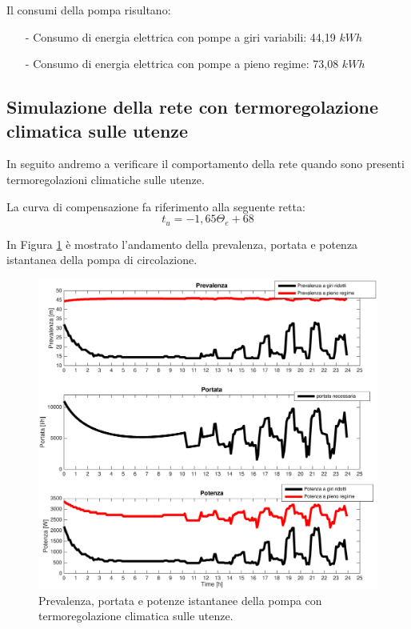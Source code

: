 \documentclass[laurea,oneside,11pt]{USiena_tesiLM3}
\begin{document}
Il consumi della pompa risultano:
\begin{itemize}
\item[-] Consumo di energia elettrica con pompe a giri variabili: 44,19 $kWh$ 
\item[-] Consumo di energia elettrica con pompe a pieno regime: 73,08 $kWh$
\end{itemize}

\subsection{Simulazione della rete con termoregolazione climatica sulle utenze}
In seguito andremo a verificare il comportamento della rete quando sono presenti termoregolazioni climatiche sulle utenze. 

La curva di compensazione fa riferimento alla seguente retta:
\begin{equation}
t_u = -1,65 \Theta_e + 68
\end{equation}

In Figura \ref{fig:sim_climatica} è mostrato l'andamento della prevalenza, portata e potenza istantanea della pompa di circolazione.

\begin{figure}[!ht]
\centering
\includegraphics[width=\textwidth]{figure/sim_climatica} 
\caption{Prevalenza, portata e potenze istantanee della pompa con termoregolazione climatica sulle utenze.}
\label{fig:sim_climatica}
\end{figure}
\end{document}
